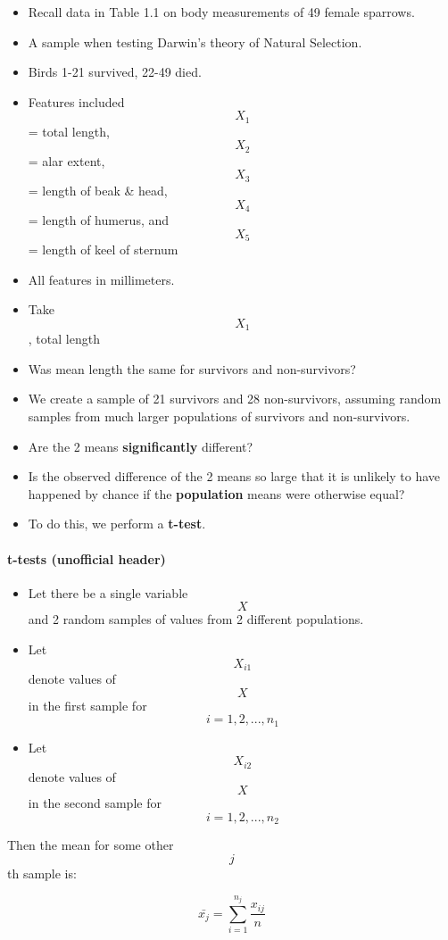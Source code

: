 \begin{itemize}
\tightlist
\item
  Recall data in Table 1.1 on body measurements of 49 female sparrows.
\item
  A sample when testing Darwin's theory of Natural Selection.
\item
  Birds 1-21 survived, 22-49 died.
\item
  Features included \[X_1\] = total length, \[X_2\] = alar extent,
  \[X_3\] = length of beak \& head, \[X_4\] = length of humerus, and
  \[X_5\] = length of keel of sternum
\item
  All features in millimeters.
\item
  Take \[X_1\], total length
\item
  Was mean length the same for survivors and non-survivors?
\item
  We create a sample of 21 survivors and 28 non-survivors, assuming
  random samples from much larger populations of survivors and
  non-survivors.
\item
  Are the 2 means \textbf{significantly} different?
\item
  Is the observed difference of the 2 means so large that it is unlikely
  to have happened by chance if the \textbf{population} means were
  otherwise equal?
\item
  To do this, we perform a \textbf{t-test}.
\end{itemize}

\hypertarget{t-tests-unofficial-header}{%
\paragraph{t-tests (unofficial
header)}\label{t-tests-unofficial-header}}

\begin{itemize}
\tightlist
\item
  Let there be a single variable \[X\] and 2 random samples of values
  from 2 different populations.
\item
  Let \[X_{i1}\] denote values of \[X\] in the first sample for
  \[i = 1,2,...,n_1\]
\item
  Let \[X_{i2}\]denote values of \[X\] in the second sample for
  \[i = 1,2,...,n_2\]
\end{itemize}

Then the mean for some other \[j\]th sample is:

\[\bar{x_j} = \sum_{i = 1}^{n_j} \frac{x_{ij}}{n}\]

